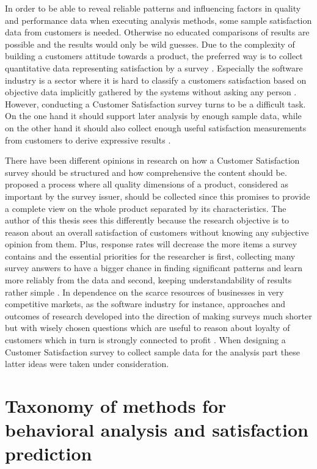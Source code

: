 In order to be able to reveal reliable patterns and influencing factors in quality and performance data when executing analysis methods, some sample satisfaction data from customers is needed. Otherwise no educated comparisons of results are possible and the results would only be wild guesses. Due to the complexity of building a customers attitude towards a product, the preferred way is to collect quantitative data representing satisfaction by a survey \cite{yuksel1998customer} \cite{hayes1998measuring}. Especially the software industry is a sector where it is hard to classify a customers satisfaction based on objective data implicitly gathered by the systems without asking any person \cite{hayes1998measuring}. However, conducting a Customer Satisfaction survey turns to be a difficult task. On the one hand it should support later analysis by enough sample data, while on the other hand it should also collect enough useful satisfaction measurements from customers to derive expressive results \cite{sauermann2013increasing}. 

There have been different opinions in research on how a Customer Satisfaction survey should be structured and how comprehensive the content should be. \cite{hayes1998measuring} proposed a process where all quality dimensions of a product, considered as important by the survey issuer, should be collected since this promises to provide a complete view on the whole product separated by its characteristics. The author of this thesis sees this differently because the research objective is to reason about an overall satisfaction of customers without knowing any subjective opinion from them. Plus, response rates will decrease the more items a survey contains and the essential priorities for the researcher is first, collecting many survey answers to have a bigger chance in finding significant patterns and learn more reliably from the data and second, keeping understandability of results rather simple \cite{sauermann2013increasing}. In dependence on the scarce resources of businesses in very competitive markets, as the software industry for instance, approaches and outcomes of research developed into the direction of making surveys much shorter but with wisely chosen questions which are useful to reason about loyalty of customers which in turn is strongly connected to profit \cite{reichheld2003one}. When designing a Customer Satisfaction survey to collect sample data for the analysis part these latter ideas were taken under consideration. 

\section{Taxonomy of methods for behavioral analysis and satisfaction prediction}

